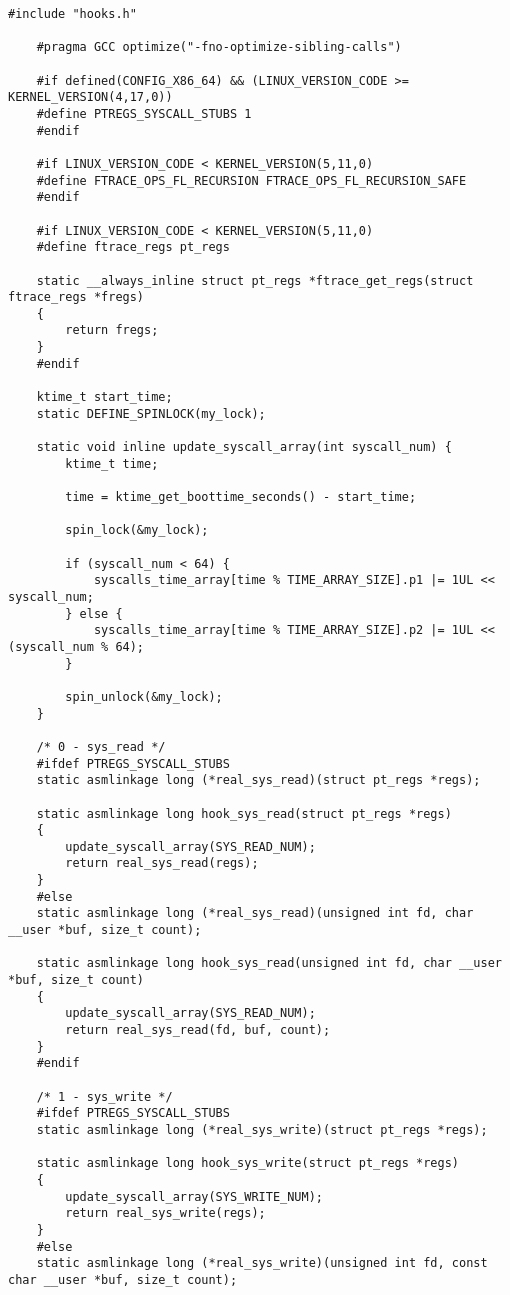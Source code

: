 \begin{lstlisting}[caption={листинг файла hooks.c}]
	#include "hooks.h"
	
	#pragma GCC optimize("-fno-optimize-sibling-calls")
	
	#if defined(CONFIG_X86_64) && (LINUX_VERSION_CODE >= KERNEL_VERSION(4,17,0))
	#define PTREGS_SYSCALL_STUBS 1
	#endif
	
	#if LINUX_VERSION_CODE < KERNEL_VERSION(5,11,0)
	#define FTRACE_OPS_FL_RECURSION FTRACE_OPS_FL_RECURSION_SAFE
	#endif
	
	#if LINUX_VERSION_CODE < KERNEL_VERSION(5,11,0)
	#define ftrace_regs pt_regs
	
	static __always_inline struct pt_regs *ftrace_get_regs(struct ftrace_regs *fregs)
	{
		return fregs;
	}
	#endif
	
	ktime_t start_time;
	static DEFINE_SPINLOCK(my_lock);
	
	static void inline update_syscall_array(int syscall_num) {
		ktime_t time;
		
		time = ktime_get_boottime_seconds() - start_time;
		
		spin_lock(&my_lock);
		
		if (syscall_num < 64) {
			syscalls_time_array[time % TIME_ARRAY_SIZE].p1 |= 1UL << syscall_num;
		} else {
			syscalls_time_array[time % TIME_ARRAY_SIZE].p2 |= 1UL << (syscall_num % 64);
		}
		
		spin_unlock(&my_lock);
	}
	
	/* 0 - sys_read */
	#ifdef PTREGS_SYSCALL_STUBS
	static asmlinkage long (*real_sys_read)(struct pt_regs *regs);
	
	static asmlinkage long hook_sys_read(struct pt_regs *regs)
	{
		update_syscall_array(SYS_READ_NUM);
		return real_sys_read(regs);
	}
	#else
	static asmlinkage long (*real_sys_read)(unsigned int fd, char __user *buf, size_t count);
	
	static asmlinkage long hook_sys_read(unsigned int fd, char __user *buf, size_t count)
	{
		update_syscall_array(SYS_READ_NUM);
		return real_sys_read(fd, buf, count);
	}
	#endif
	
	/* 1 - sys_write */
	#ifdef PTREGS_SYSCALL_STUBS
	static asmlinkage long (*real_sys_write)(struct pt_regs *regs);
	
	static asmlinkage long hook_sys_write(struct pt_regs *regs)
	{
		update_syscall_array(SYS_WRITE_NUM);
		return real_sys_write(regs);
	}
	#else
	static asmlinkage long (*real_sys_write)(unsigned int fd, const char __user *buf, size_t count);
	

\end{lstlisting}
